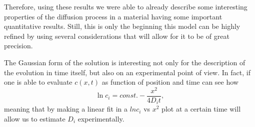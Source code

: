 Therefore, using these results we were able to already describe some interesting properties of the diffusion process in a material having some important quantitative results. Still, this is only the beginning this model can be highly refined by using several considerations that will allow for it to be of great precision.

\nt
{
    The Gaussian form of the solution is interesting not only for the description of the evolution in time itself, but also on an experimental point of view. In fact, if one is able to evaluate $c(x, t)$ as function of position and time can see how
    \begin{equation}
        \ln c_i = const. - \frac{x^2}{4D_it},
    \end{equation}
    meaning that by making a linear fit in a $ln c_i$ vs $x^2$ plot at a certain time will allow us to estimate $D_i$ experimentally.
}